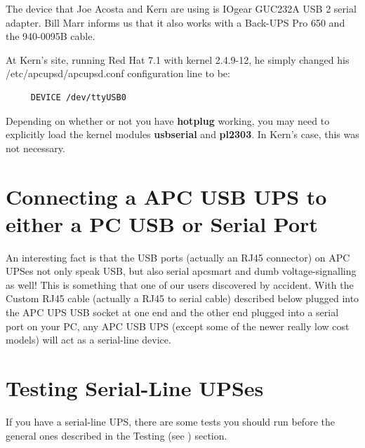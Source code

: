 {{{{{{{The device that Joe Acosta and Kern are using is IOgear GUC232A USB 2 serial
adapter. Bill Marr informs us that it also works with a Back-UPS Pro 650 and
the 940-0095B cable.  

At Kern's site, running Red Hat 7.1 with kernel 2.4.9-12, he simply changed
his /etc/apcupsd/apcupsd.conf configuration line to be: 

\footnotesize
\begin{verbatim}
     DEVICE /dev/ttyUSB0
\end{verbatim}
\normalsize

Depending on whether or not you have {\bf hotplug} working, you may need to
explicitly load the kernel modules {\bf usbserial} and {\bf pl2303}. In Kern's
case, this was not necessary. 

\label{Connecting-a-APC-USB-UPS-to-either-a-PC-USB-or-Serial-Port}

\section*{Connecting a APC USB UPS to either a PC USB or Serial Port}

An interesting fact is that the USB ports (actually an RJ45 connector) on APC
UPSes not only speak USB, but also serial apcsmart and dumb voltage-signalling
as well! This is something that one of our users discovered by accident. With
the Custom RJ45 cable (actually a RJ45 to serial cable) described below
plugged into the APC UPS USB socket at one end and the other end plugged into
a serial port on your PC, any APC USB UPS (except some of the newer really low
cost models) will act as a serial-line device. 



\label{Testing-Serial_002dLine-UPSes}
\section*{Testing Serial-Line UPSes}

\label{index-Testing_002c-Serial-219}
\label{index-Serial_002c-Testing-220}
If you have a serial-line UPS, there are some tests you should run before the
general ones described in the Testing (see 
) section.  

}}}}}}}
